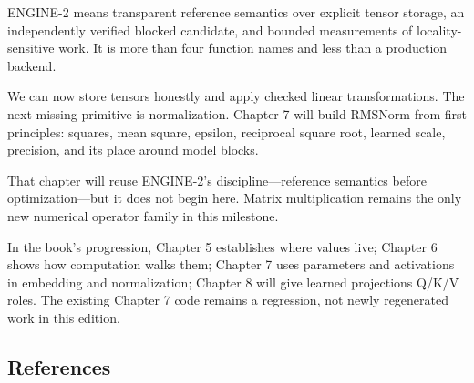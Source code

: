 \documentclass[
  10pt,
]{article}
\begin{document}
ENGINE-2 means transparent reference semantics over explicit tensor
storage, an independently verified blocked candidate, and bounded
measurements of locality-sensitive work. It is more than four function
names and less than a production backend.

We can now store tensors honestly and apply checked linear
transformations. The next missing primitive is normalization. Chapter 7
will build RMSNorm from first principles: squares, mean square, epsilon,
reciprocal square root, learned scale, precision, and its place around
model blocks.

That chapter will reuse ENGINE-2's discipline---reference semantics
before optimization---but it does not begin here. Matrix multiplication
remains the only new numerical operator family in this milestone.

In the book's progression, Chapter 5 establishes where values live;
Chapter 6 shows how computation walks them; Chapter 7 uses parameters
and activations in embedding and normalization; Chapter 8 will give
learned projections Q/K/V roles. The existing Chapter 7 code remains a
regression, not newly regenerated work in this edition.

\subsection{References}\label{references-3}
\end{document}
